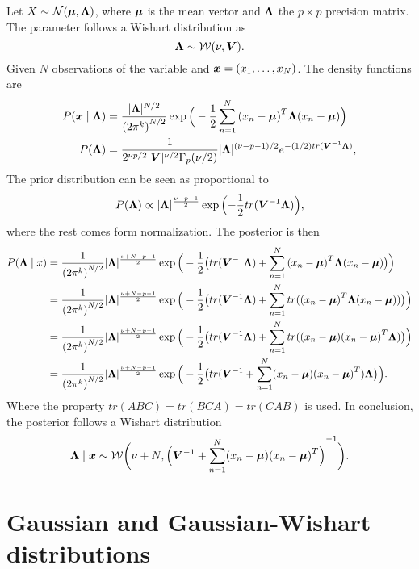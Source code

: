 Let \(X \sim \mathcal{N}(\bm{\mu}, \bm{\Lambda})\), where \(\bm{\mu}\) is the mean vector and \(\bm{\Lambda}\) the \(p \times p\)  precision matrix. The parameter follows a Wishart distribution as
\[
  \bm{\Lambda} \sim \mathcal{W}(\nu, \bm{V}).
\]
Given \(N\) observations of the variable and \(\bm{x} =(x_{1},\dots, x_{N})\). The density functions are
\[
  \begin{aligned}
    P(\bm{x} \mid \bm{\Lambda}) &= \frac{|\bm{\Lambda}|^{N/2}}{{(2\pi^{k})}^{N/2}}\exp \Big( -\frac{1}{2}\sum_{n=1}^{N}{(x_{n} - \bm{\mu})}^{T}\bm{\Lambda}(x_{n} - \bm{\mu}) \Big)\\
    P(\bm{\Lambda}) &= \frac{1}{2^{\nu p/2} |\bm{V}|^{\nu/2} \Gamma_{p}(\nu/2)}|\bm{\Lambda}|^{(\nu-p-1)/2}e^{-(1/2)tr(\bm{V}^{-1}\bm{\Lambda})},
  \end{aligned}
\]
The prior distribution can be seen as proportional to
\[
  P(\bm{\Lambda}) \propto |\bm{\Lambda}|^{\frac{\nu-p-1}{2}} \exp \Big({-\frac{1}{2}tr(\bm{V}^{-1}\bm{\Lambda})}\Big),
\]
where the rest comes form normalization.
The posterior is then
\[
  \begin{aligned}
    P(\bm{\Lambda} \mid x) &= \frac{1}{ {(2\pi^{k})}^{N/2}}|\bm{\Lambda}|^{\frac{\nu+N-p-1}{2}} \exp \Big( -\frac{1}{2} \big(tr(\bm{V}^{-1}\bm{\Lambda}) + \sum_{n=1}^{N}{(x_{n} - \bm{\mu})}^{T}\bm{\Lambda}(x_{n} - \bm{\mu})\big) \Big)\\
    &= \frac{1}{ {(2\pi^{k})}^{N/2}}|\bm{\Lambda}|^{\frac{\nu+N-p-1}{2}} \exp \Big( -\frac{1}{2} \big( tr(\bm{V}^{-1}\bm{\Lambda}) + \sum_{n=1}^{N}tr({(x_{n} - \bm{\mu})}^{T}\bm{\Lambda}(x_{n} - \bm{\mu}))\big) \Big)\\
    &= \frac{1}{ {(2\pi^{k})}^{N/2}}|\bm{\Lambda}|^{\frac{\nu+N-p-1}{2}} \exp \Big( -\frac{1}{2} \big( tr(\bm{V}^{-1}\bm{\Lambda}) + \sum_{n=1}^{N}tr ((x_{n} - \bm{\mu}){(x_{n} - \bm{\mu})}^{T}\bm{\Lambda})\big) \Big)\\
    &= \frac{1}{ {(2\pi^{k})}^{N/2}}|\bm{\Lambda}|^{\frac{\nu+N-p-1}{2}} \exp \Big( -\frac{1}{2} \big( tr ( \bm{V}^{-1} +  \sum_{n=1}^{N}(x_{n} - \bm{\mu}){(x_{n} - \bm{\mu})}^{T})\bm{\Lambda}\big) \Big).
  \end{aligned}
\]
Where the property \(tr(ABC) = tr(BCA) = tr(CAB)\) is used. In conclusion, the posterior follows a Wishart distribution
\[
  \bm{\Lambda} \mid \bm{x} \sim \mathcal{W}\bigg(\nu + N, {\Big(\bm{V}^{-1} +  \sum_{n=1}^{N}(x_{n} - \bm{\mu}){(x_{n} - \bm{\mu})}^{T}\Big)}^{-1}\bigg).
\]

\section*{Gaussian and Gaussian-Wishart distributions}\label{ap:G-GW}

